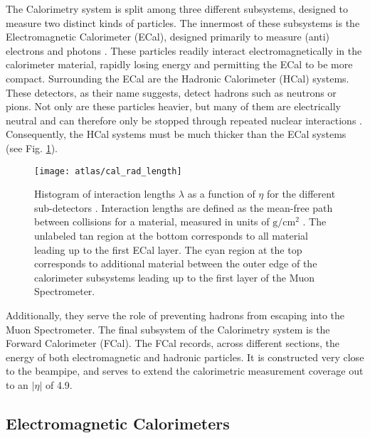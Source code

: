     The Calorimetry system is split among three different subsystems, designed to measure two distinct kinds of particles.
    The innermost of these subsystems is the Electromagnetic Calorimeter (ECal), designed primarily to measure (anti) electrons and photons \cite{calorimetry_lecture}.
    These particles readily interact electromagnetically in the calorimeter material, rapidly losing energy and permitting the ECal to be more compact.
    Surrounding the ECal are the Hadronic Calorimeter (HCal) systems.
    These detectors, as their name suggests, detect hadrons such as neutrons or pions.
    Not only are these particles heavier, but many of them are electrically neutral and can therefore only be stopped through repeated nuclear interactions \cite{energy_measurement}.
    Consequently, the HCal systems must be much thicker than the ECal systems (see Fig. \ref{fig:cal_rad_length}).
    \begin{figure}
        \texttt{[image: atlas/cal\_rad\_length]}
        \caption{
            Histogram of interaction lengths $\lambda$ as a function of $\eta$ for the different sub-detectors \cite{atlas_tdr}.
            Interaction lengths are defined as the mean-free path between collisions for a material,
                measured in units of $\textrm{g}/\textrm{cm}^2$ \cite{pdg}.
            The unlabeled tan region at the bottom corresponds to all material leading up to the first ECal layer.
            The cyan region at the top corresponds to additional material between the outer edge of the calorimeter subsystems
                leading up to the first layer of the Muon Spectrometer.
        }
        \label{fig:cal_rad_length}
    \end{figure}
    Additionally, they serve the role of preventing hadrons from escaping into the Muon Spectrometer.
    The final subsystem of the Calorimetry system is the Forward Calorimeter (FCal).
    The FCal records, across different sections, the energy of both electromagnetic and hadronic particles.
    It is constructed very close to the beampipe, and serves to extend the calorimetric measurement coverage out to an $|\eta|$ of 4.9.

    \subsection{Electromagnetic Calorimeters}

